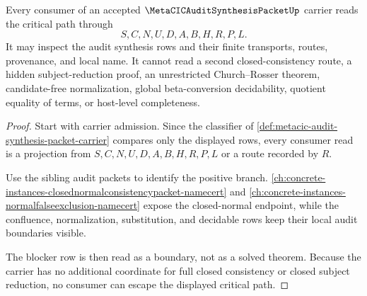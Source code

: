 \begin{theorem}
\label{thm:metacic-audit-synthesis-critical-path-nonescape}
Every consumer of an accepted $\MetaCICAuditSynthesisPacketUp$ carrier reads the critical path through
$$
S,C,N,U,D,A,B,H,R,P,L.
$$
It may inspect the audit synthesis rows and their finite transports, routes, provenance, and local name. It cannot read a second closed-consistency route, a hidden subject-reduction proof, an unrestricted Church--Rosser theorem, candidate-free normalization, global beta-conversion decidability, quotient equality of terms, or host-level completeness.
\end{theorem}
\begin{proof}
Start with carrier admission. Since the classifier of \autoref{def:metacic-audit-synthesis-packet-carrier} compares only the displayed rows, every consumer read is a projection from $S,C,N,U,D,A,B,H,R,P,L$ or a route recorded by $R$.

Use the sibling audit packets to identify the positive branch. \autoref{ch:concrete-instances-closednormalconsistencypacket-namecert} and \autoref{ch:concrete-instances-normalfalseexclusion-namecert} expose the closed-normal endpoint, while the confluence, normalization, substitution, and decidable rows keep their local audit boundaries visible.

The blocker row is then read as a boundary, not as a solved theorem. Because the carrier has no additional coordinate for full closed consistency or closed subject reduction, no consumer can escape the displayed critical path.
\end{proof}

